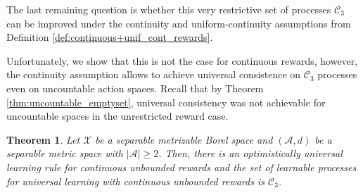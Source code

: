 \documentclass[aos]{imsart}
\theoremstyle{plain}
\newtheorem{theorem}{Theorem}[section]
\theoremstyle{remark}
\newcommand{\Acal}{\mathcal{A}}
\newcommand{\Ccal}{\mathcal{C}}
\newcommand{\Xcal}{\mathcal{X}}
\newcommand{\1}{\mathbbm{1}}%
\begin{document}
The last remaining question is whether this very restrictive set of processes $\Ccal_3$ can be improved under the continuity and uniform-continuity assumptions from Definition \ref{def:continuous+unif_cont_rewards}.

Unfortunately, we show that this is not the case for continuous rewards, however, the continuity assumption allows to achieve universal consistence on $\Ccal_3$ processes even on uncountable action spaces. Recall that by Theorem \ref{thm:uncountable_emptyset}, universal consistency was not achievable for uncountable spaces in the unrestricted reward case.

\begin{theorem}\label{thm:continuous_unbounded_rewards}
    Let $\Xcal$ be a separable metrizable Borel space and $(\Acal,d)$ be a separable metric space with $|\Acal|\geq 2$. Then, there is an optimistically universal learning rule for continuous unbounded rewards and the set of learnable processes for universal learning with continuous unbounded rewards is $\Ccal_3$.
\end{theorem}
\end{document}
